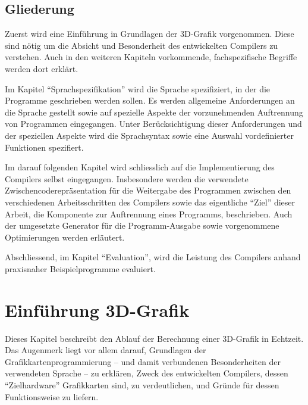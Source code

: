 \documentclass[twoside,a4paper,fleqn,12pt]{book}
\begin{document}


\section{Gliederung}

Zuerst wird eine Einführung in Grundlagen der 3D-Grafik vorgenommen. Diese sind nötig um die Absicht und Besonderheit des entwickelten Compilers zu verstehen.
Auch in den weiteren Kapiteln vorkommende, fachspezifische Begriffe werden dort erklärt.

Im Kapitel "`Sprachspezifikation"' wird die Sprache spezifiziert, in der die Programme geschrieben werden sollen.
Es werden allgemeine Anforderungen an die Sprache gestellt sowie auf spezielle Aspekte der vorzunehmenden Auftrennung von Programmen eingegangen.
Unter Berücksichtigung dieser Anforderungen und der speziellen Aspekte wird die Sprachsyntax sowie eine Auswahl vordefinierter Funktionen spezifiert.

Im darauf folgenden Kapitel wird schliesslich auf die Implementierung des Compilers selbst eingegangen. Insbesondere werden die verwendete Zwischencoderepräsentation
für die Weitergabe des Programmen zwischen den verschiedenen Arbeitsschritten des Compilers sowie das eigentliche "`Ziel"' dieser Arbeit,
die Komponente zur Auftrennung eines Programms, beschrieben. Auch der umgesetzte Generator für die Programm-Ausgabe sowie vorgenommene Optimierungen
werden erläutert.

Abschliessend, im Kapitel "`Evaluation"', wird die Leistung des Compilers anhand praxisnaher Beispielprogramme evaluiert.


\chapter{Einführung 3D-Grafik}

Dieses Kapitel beschreibt den Ablauf der Berechnung einer 3D-Grafik in Echtzeit.
Das Augenmerk liegt vor allem darauf, Grundlagen der Grafikkartenprogrammierung -- und damit verbundenen
Besonderheiten der verwendeten Sprache -- zu erklären, Zweck des entwickelten Compilers, dessen "`Zielhardware"' Grafikkarten sind,
zu verdeutlichen, und Gründe für dessen Funktionsweise zu liefern.
\end{document}
